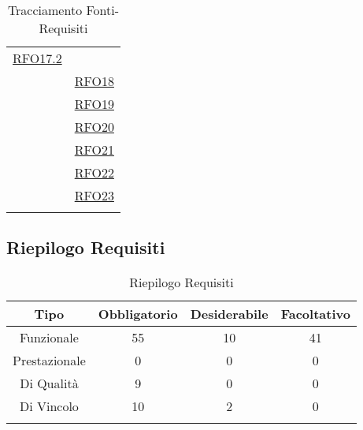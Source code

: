 \begin{longtable}{|>{\centering}m{5cm}|m{5cm}<{\centering}|}
	\hyperlink{RFO17.2}{RFO17.2}\\ & \hyperlink{RFO18}{RFO18}\\ & \hyperlink{RFO19}{RFO19}\\ & \hyperlink{RFO20}{RFO20}\\ & \hyperlink{RFO21}{RFO21}\\ & \hyperlink{RFO22}{RFO22}\\ & \hyperlink{RFO23}{RFO23}\\ \hline
	\caption[Tracciamento Fonti-Requisiti]{Tracciamento Fonti-Requisiti}
	\label{tabella:fonti-requi}
\end{longtable}
\clearpage

\subsection{Riepilogo Requisiti}
\normalsize
\begin{longtable}{|c|c|c|c|}
	\hline 
	\textbf{Tipo} & \textbf{Obbligatorio} & \textbf{Desiderabile} & \textbf{Facoltativo}\\
	\hline
	Funzionale & 55 & 10 & 41\\ \hline
	Prestazionale & 0 & 0 & 0\\ \hline
	Di Qualità & 9 & 0 & 0\\ \hline
	Di Vincolo & 10 & 2 & 0\\ \hline
	\caption[Riepilogo Requisiti]{Riepilogo Requisiti}
	\label{tabella:riepilogorequi}
\end{longtable}
\clearpage


